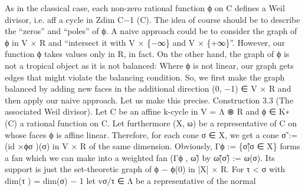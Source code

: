\documentclass[
  11pt,
]{article}
\newenvironment{Shaded}{}{}
\newcommand{\NormalTok}[1]{#1}
\begin{document}
\begin{Shaded}
\begin{Highlighting}[]
\NormalTok{As in the classical case, each non{-}zero rational function ϕ on C defines a Weil divisor, i.e.}
\NormalTok{             aff}
\NormalTok{a cycle in Zdim  C−1 (C). The idea of course should be to describe the “zeros” and “poles”}
\NormalTok{of ϕ. A naive approach could be to consider the graph of ϕ in V × R and “intersect it with}
\NormalTok{V × \{−∞\} and V × \{+∞\}”. However, our function ϕ takes values only in R, in fact. On}
\NormalTok{the other hand, the graph of ϕ is not a tropical object as it is not balanced: Where ϕ is not}
\NormalTok{linear, our graph gets edges that might violate the balancing condition. So, we first make}
\NormalTok{the graph balanced by adding new faces in the additional direction (0, −1) ∈ V × R and}
\NormalTok{then apply our naive approach. Let us make this precise.}
\NormalTok{Construction 3.3 (The associated Weil divisor). Let C be an affine k{-}cycle in V = Λ ⊗ R}
\NormalTok{and ϕ ∈ K∗ (C) a rational function on C. Let furthermore (X, ω) be a representative}
\NormalTok{of C on whose faces ϕ is affine linear. Therefore, for each cone σ ∈ X, we get a cone}
\NormalTok{σ̃ := (id ×ϕσ )(σ) in V × R of the same dimension. Obviously, Γϕ := \{σ̃|σ ∈ X\} forms}
\NormalTok{a fan which we can make into a weighted fan (Γϕ , ω̃) by ω̃(σ̃) := ω(σ). Its support is just}
\NormalTok{the set{-}theoretic graph of ϕ − ϕ(0) in |X| × R.}
\NormalTok{For τ \textless{} σ with dim(τ ) = dim(σ) − 1 let vσ/τ ∈ Λ be a representative of the normal}
                                      

\end{Highlighting}
\end{Shaded}
\end{document}
